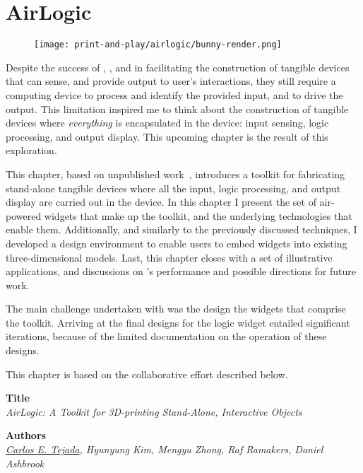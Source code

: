\chapter{AirLogic} \label{ch:airlogic}
  \begin{figure}[h]
    \centering
    \texttt{[image: print-and-play/airlogic/bunny-render.png]}
  \end{figure}

  Despite the success of \at, \bh, and \mp in facilitating the construction of
  tangible devices that can sense, and provide output to user's interactions,
  they still require a computing device to process and identify the provided
  input, and to drive the output.  This limitation inspired me to think about
  the construction of tangible devices where \emph{everything} is encapsulated
  in the device: input sensing, logic processing, and output display. This
  upcoming chapter is the result of this exploration.

  This chapter, based on unpublished work~\cite{Tejada:}, introduces a toolkit
  for fabricating stand-alone tangible devices where all the input, logic
  processing, and output display are carried out in the device. In this chapter
  I present the set of air-powered widgets that make up the \al toolkit, and the
  underlying technologies that enable them. Additionally, and similarly to the
  previously discussed techniques, I developed a design environment to enable
  users to embed \al widgets into existing three-dimensional models. Last, this
  chapter closes with a set of illustrative applications, and discussions on
  \al's performance and possible directions for future work.

  The main challenge undertaken with \al was the design the widgets that
  comprise the toolkit. Arriving at the final designs for the logic widget
  entailed significant iterations, because of the limited documentation on the
  operation of these designs.


  \newpage

  This chapter is based on the collaborative effort described below.

  \vfill

  \noindent
  \textbf{Title}\\
  \textit{AirLogic: A Toolkit for 3D-printing Stand-Alone, Interactive Objects}

  \bigskip

  \noindent
  \textbf{Authors}\\
  \textit{\underline{Carlos E. Tejada}, Hyunyung Kim, Mengyu Zhong, Raf Ramakers, Daniel Ashbrook}

